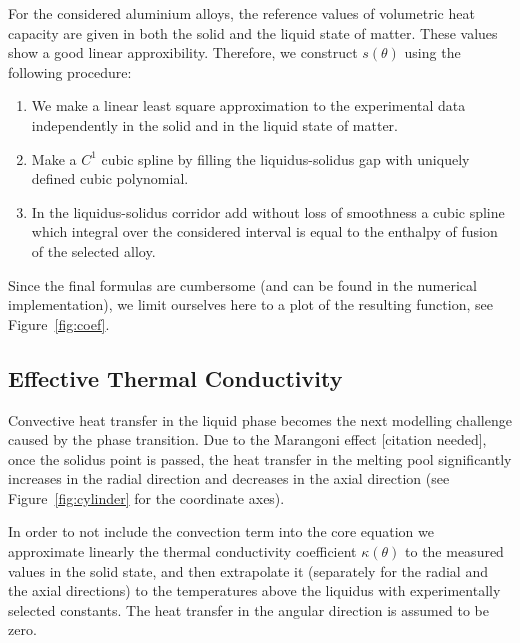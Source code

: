 For the considered aluminium alloys, the reference values of volumetric heat capacity are given in both the solid and the liquid state of matter. These values show a good linear approxibility. Therefore, we construct $s(\theta)$ using the following procedure:
\begin{enumerate}
	\item We make a linear least square approximation to the experimental data independently in the solid and in the liquid state of matter.
	\item Make a $C^1$ cubic spline by filling the liquidus-solidus gap with uniquely defined cubic polynomial.
	\item In the liquidus-solidus corridor add without loss of smoothness a cubic spline which integral over the considered interval is equal to the enthalpy of fusion of the selected alloy.
\end{enumerate}

Since the final formulas are cumbersome (and can be found in the numerical implementation), we limit ourselves here to a plot of the resulting function, see Figure~\ref{fig:coef}.


\subsection{Effective Thermal Conductivity}
\label{subsec:conductivity}

Convective heat transfer in the liquid phase becomes the next modelling challenge caused by the phase transition. Due to the Marangoni effect [citation needed], once the solidus point is passed, the heat transfer in the melting pool significantly increases in the radial direction and decreases in the axial direction (see Figure~\ref{fig:cylinder} for the coordinate axes).

In order to not include the convection term into the core equation we approximate linearly the thermal conductivity coefficient $\kappa(\theta)$ to the measured values in the solid state, and then extrapolate it (separately for the radial and the axial directions) to the temperatures above the liquidus with experimentally selected constants. The heat transfer in the angular direction is assumed to be zero.


